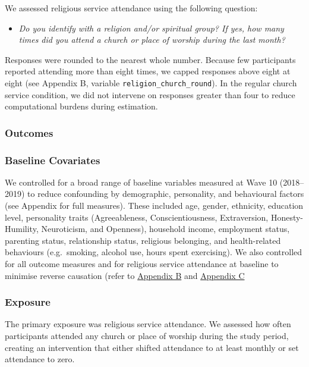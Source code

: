 \documentclass[
  single column]{article}
\providecommand{\tightlist}{%
  \setlength{\itemsep}{0pt}\setlength{\parskip}{0pt}}\usepackage{longtable,booktabs,array}
\begin{document}
We assessed religious service attendance using the following question:

\begin{itemize}
\tightlist
\item
  \emph{Do you identify with a religion and/or spiritual group? If yes,
  how many times did you attend a church or place of worship during the
  last month?}
\end{itemize}

Responses were rounded to the nearest whole number. Because few
participants reported attending more than eight times, we capped
responses above eight at eight (see Appendix B, variable
\texttt{religion\_church\_round}). In the regular church service
condition, we did not intervene on responses greater than four to reduce
computational burdens during estimation.

\subsubsection{Outcomes}\label{outcomes}

\subsubsection{Baseline Covariates}\label{baseline-covariates}

We controlled for a broad range of baseline variables measured at Wave
10 (2018--2019) to reduce confounding by demographic, personality, and
behavioural factors (see Appendix for full measures). These included
age, gender, ethnicity, education level, personality traits
(Agreeableness, Conscientiousness, Extraversion, Honesty-Humility,
Neuroticism, and Openness), household income, employment status,
parenting status, relationship status, religious belonging, and
health-related behaviours (e.g.~smoking, alcohol use, hours spent
exercising). We also controlled for all outcome measures and for
religious service attendance at baseline to minimise reverse causation
(refer to \hyperref[appendix-baseline]{Appendix B} and
\hyperref[appendix-confounding]{Appendix C}

\subsubsection{Exposure}\label{exposure}

The primary exposure was religious service attendance. We assessed how
often participants attended any church or place of worship during the
study period, creating an intervention that either shifted attendance to
at least monthly or set attendance to zero.
\end{document}
